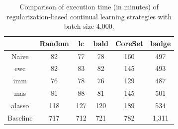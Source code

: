 \begin{table}[h]
    \centering
    \begin{tabular}{c | c c c c c } 
         & Random & \gls{lc} & \gls{bald} & CoreSet & \gls{badge}\\ 
        \hline
        Naive & 82 & 77 & 78 & 160 & 497 \\
        \gls{ewc} & 82 & 83 & 82 & 145 & 493\\
        \gls{imm} & 76 & 78 & 76 & 129 & 487\\
        \gls{mas} & 81 & 88 & 81 & 145 & 501\\
        \gls{alasso} & 118 & 127 & 120 & 189 & 534\\
        \hline 
        Baseline & 717 & 712 & 721 & 782 & 1,311 \\
    \end{tabular}
    \caption{Comparison of execution time (in minutes) of regularization-based continual learning strategies
    with batch size 4,000.}
    \label{fig:Evaluation:CAL:4000bTime}
\end{table}



